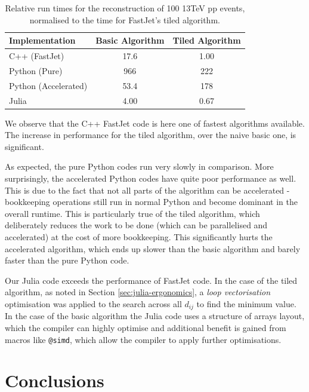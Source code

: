 \documentclass{webofc}
\begin{document}
\begin{table}[h]
  \begin{center}
    \begin{tabular}{l|cc}
      \textbf{Implementation} & \textbf{Basic Algorithm} & \textbf{Tiled Algorithm} \\
      \hline
      C++ (FastJet) & 17.6 & 1.00 \\
      Python (Pure) & 966 & 222 \\
      Python (Accelerated) & 53.4 & 178 \\
      Julia & 4.00 & 0.67 \\
    \end{tabular}
    \caption{Relative run times for the reconstruction of 100 13TeV pp events, normalised to the time for FastJet's tiled algorithm.}
    \label{tab:results}
  \end{center}
\end{table}

We observe that the C++ FastJet code is here one of fastest algorithms
available. The increase in performance for the tiled algorithm, over the naive
basic one, is significant. 

As expected, the pure Python codes run very slowly in comparison. More
surprisingly, the accelerated Python codes have quite poor performance as well.
This is due to the fact that not all parts of the algorithm can be accelerated -
bookkeeping operations still run in normal Python and become dominant in the
overall runtime. This is particularly true of the tiled algorithm, which
deliberately reduces the work to be done (which can be parallelised and
accelerated) at the cost of more bookkeeping. This significantly hurts the
accelerated algorithm, which ends up slower than the basic algorithm and barely
faster than the pure Python code.

Our Julia code exceeds the performance of FastJet code. In the case of the tiled
algorithm, as noted in Section \ref{sec:julia-ergonomics}, a \emph{loop
vectorisation} optimisation was applied to the search across all $d_{ij}$ to
find the minimum value. In the case of the basic algorithm the Julia code uses a
structure of arrays layout, which the compiler can highly optimise and
additional benefit is gained from macros like \texttt{@simd}, which allow the
compiler to apply further optimisations.

\section{Conclusions}
\label{sec:conclusions}
\end{document}
